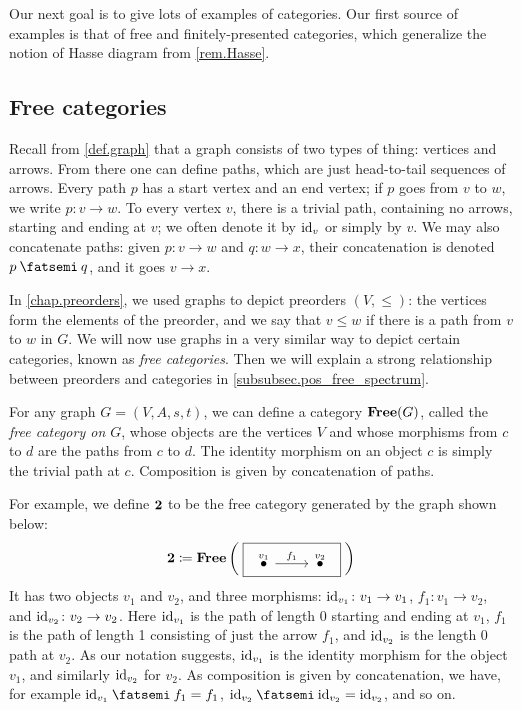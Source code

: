 \documentclass[7Sketches]{subfiles}
\begin{document}
Our next goal is to give lots of examples of categories. Our first source of
examples is that of free and finitely-presented categories, which generalize the
notion of Hasse diagram from \cref{rem.Hasse}.

\subsection{Free categories}%
\label{subsubsec.path_cats}%
Recall from \cref{def.graph} that a graph consists of two types of thing: vertices and arrows. From there one can define
paths, which are just head-to-tail sequences of arrows. Every path $p$ has a start
vertex and an end vertex; if $p$ goes from $v$ to $w$, we write $p\colon v\to w$. To every vertex $v$, there is a trivial path, containing no arrows,%
starting and ending at $v$; we often denote it by $\mathrm{id}_v$ or simply by $v$. We may also concatenate paths: given $p\colon v\to w$ and $q\colon w\to x$, their concatenation is denoted $p\cp q$, and it goes $v\to x$.

In \cref{chap.preorders}, we used graphs to depict preorders $(V,\leq)$: the vertices form the elements of the preorder, and we say that $v\leq w$ if there is a path from $v$ to $w$ in $G$.
We will now use graphs in a very similar way to depict certain categories, known
as \emph{free categories}. Then we will explain a strong relationship between
preorders and categories in \cref{subsubsec.pos_free_spectrum}.

\begin{definition}%
\label{def.free_category}%
%
%
For any graph $G = (V,A,s,t)$, we can define a category $\mathbf{Free}(G)$,
called the \emph{free category on $G$}, whose objects are the vertices $V$ and
whose morphisms from $c$ to $d$ are the paths from $c$ to $d$. The identity
morphism on an object $c$ is simply the trivial path at $c$. Composition is given by concatenation of paths.%
%
\end{definition}

For example, we define $\mathbf{2}$ to be the free category generated by the graph shown below:
\begin{equation}%
\label{eqn.graphs_1_2}
\Cat{2}\coloneqq\free\left(\;\raisebox{-.05in}{\fbox{
\begin{tikzcd}[ampersand replacement=\&]
	\LMO{v_1}\ar[r, "f_1"]\&\LMO{v_2}
\end{tikzcd}
}}
\;\right)
\end{equation}
It has two objects $v_1$ and $v_2$,
and three morphisms: $\mathrm{id}_{v_1}\colon v_1 \to v_1$, $f_1\colon v_1 \to v_2$,
and $\mathrm{id}_{v_2}\colon v_2 \to v_2$. Here $\mathrm{id}_{v_1}$ is the path of length 0
starting and ending at $v_1$, $f_1$ is the path of length 1 consisting
of just the arrow $f_1$, and $\mathrm{id}_{v_2}$ is the length 0 path at $v_2$. As our
notation suggests, $\mathrm{id}_{v_1}$ is the identity morphism for the object $v_1$, and
similarly $\mathrm{id}_{v_2}$ for $v_2$. As composition is given by concatenation, we
have, for example $\id_{v_1}\cp f_1 =f_1$, $\id_{v_2}\cp \id_{v_2}=\id_{v_2}$, and so
on.
\end{document}
